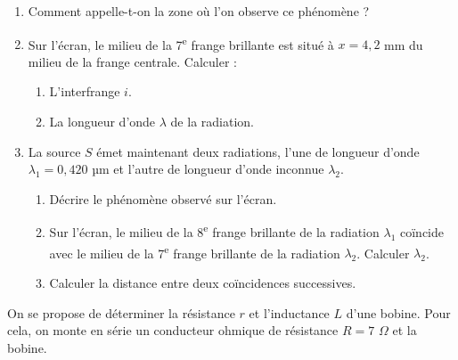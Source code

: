 \documentclass[11pt]{article}
\begin{document}
\begin{enumerate}
  \item Comment appelle-t-on la zone où l'on observe ce phénomène ?
  \item Sur l'écran, le milieu de la 7\textsuperscript{e} frange brillante est situé à $x = 4{,}2$ mm du milieu de la frange centrale. Calculer :
  \begin{enumerate}[label=\alph*.]
    \item L'interfrange $i$.
    \item La longueur d'onde $\lambda$ de la radiation.
  \end{enumerate}
  \item La source $S$ émet maintenant deux radiations, l'une de longueur d'onde $\lambda_1 = 0{,}420$ µm et l'autre de longueur d'onde inconnue $\lambda_2$.
  \begin{enumerate}[label=\alph*.]
    \item Décrire le phénomène observé sur l'écran.
    \item Sur l'écran, le milieu de la 8\textsuperscript{e} frange brillante de la radiation $\lambda_1$ coïncide avec le milieu de la 7\textsuperscript{e} frange brillante de la radiation $\lambda_2$. Calculer $\lambda_2$.
    \item Calculer la distance entre deux coïncidences successives.
  \end{enumerate}
\end{enumerate}

On se propose de déterminer la résistance $r$ et l'inductance $L$ d'une bobine. Pour cela, on monte en série un conducteur ohmique de résistance $R = 7$ $\Omega$ et la bobine.

\begin{center}
\end{center}
\end{document}
